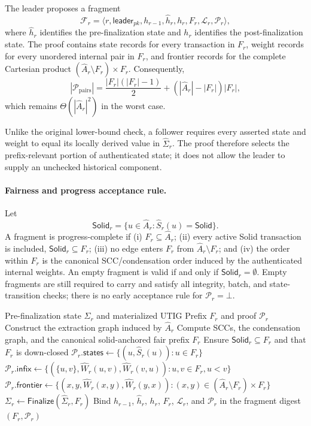 The leader proposes a fragment
\[
 \mathcal F_r=\langle
 r,\mathsf{leader}_{pk},h_{r-1},\widehat h_r,h_r,
 F_r,\mathcal L_r,\mathcal P_r\rangle,
\]
where $\widehat h_r$ identifies the pre-finalization state and $h_r$
identifies the post-finalization state. The proof contains state records for
every transaction in $F_r$, weight records for every unordered internal pair
in $F_r$, and frontier records for the complete Cartesian product
$(\widehat A_r\setminus F_r)\times F_r$. Consequently,
\[
 |\mathcal P_{\mathrm{pairs}}|
 =\frac{|F_r|(|F_r|-1)}{2}
 +( |\widehat A_r|-|F_r| )|F_r|,
\]
which remains $\Theta(|\widehat A_r|^2)$ in the worst case.

Unlike the original lower-bound check, a follower requires every asserted
state and weight to equal its locally derived value in
$\widehat\Sigma_r$. The proof therefore selects the prefix-relevant portion
of authenticated state; it does not allow the leader to supply an unchecked
historical component.

\paragraph{Fairness and progress acceptance rule.}
Let
\[
 \mathsf{Solid}_r=\{u\in\widehat A_r:
 \widehat S_r(u)=\mathsf{Solid}\}.
\]
A fragment is progress-complete if (i) $F_r\subseteq\widehat A_r$;
(ii) every active Solid transaction is included,
$\mathsf{Solid}_r\subseteq F_r$; (iii) no edge enters $F_r$ from
$\widehat A_r\setminus F_r$; and (iv) the order within $F_r$ is the canonical
SCC/condensation order induced by the authenticated internal weights. An
empty fragment is valid if and only if $\mathsf{Solid}_r=\emptyset$. Empty
fragments are still required to carry and satisfy all integrity, batch, and
state-transition checks; there is no early acceptance rule for
$\mathcal P_r=\bot$.

\begin{algorithm}[t]
\caption{Generate an Authenticated Prefix Proof}
\label{alg:generate-authenticated-proof}
\begin{algorithmic}[1]
\Require Pre-finalization state $\widehat\Sigma_r$ and materialized UTIG
\Ensure Prefix $F_r$ and proof $\mathcal P_r$
\State Construct the extraction graph induced by $\widehat A_r$
\State Compute SCCs, the condensation graph, and the canonical solid-anchored
       fair prefix $F_r$
\State Ensure $\mathsf{Solid}_r\subseteq F_r$ and that $F_r$ is down-closed
\State $\mathcal P_r.\mathsf{states}\gets
       \{(u,\widehat S_r(u)):u\in F_r\}$
\State $\mathcal P_r.\mathsf{infix}\gets
       \{(\{u,v\},\widehat W_r(u,v),\widehat W_r(v,u)):
          u,v\in F_r,u<v\}$
\State $\mathcal P_r.\mathsf{frontier}\gets
       \{(x,y,\widehat W_r(x,y),\widehat W_r(y,x)):
          (x,y)\in(\widehat A_r\setminus F_r)\times F_r\}$
\State $\Sigma_r\gets\mathsf{Finalize}(\widehat\Sigma_r,F_r)$
\State Bind $h_{r-1}$, $\widehat h_r$, $h_r$, $F_r$, $\mathcal L_r$, and
       $\mathcal P_r$ in the fragment digest
\State \Return $(F_r,\mathcal P_r)$
\end{algorithmic}
\end{algorithm}

